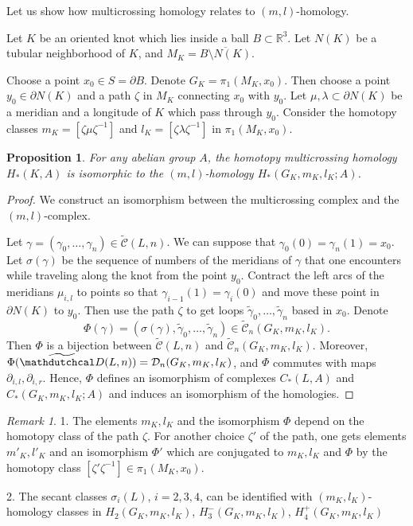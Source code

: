 \documentclass{article}
\newtheorem{proposition}{Proposition}
\theoremstyle{definition}
\theoremstyle{remark}
\newtheorem{remark}{Remark}
\def\R{{\mathbb R}}
\begin{document}
Let us show how multicrossing homology relates to $(m,l)$-homology.

Let $K$ be an oriented knot which lies inside a ball $B\subset\R^3$. Let $N(K)$ be a tubular neighborhood of $K$, and $M_K=\overline{B\setminus N(K)}$.

Choose a point $x_0\in S=\partial B$. Denote $G_K=\pi_1(M_K,x_0)$. Then choose a point $y_0\in\partial N(K)$ and a path $\zeta$ in $M_K$ connecting $x_0$ with $y_0$. Let $\mu,\lambda\subset\partial N(K)$ be a meridian and a longitude of $K$ which pass through $y_0$. Consider the homotopy classes $m_K=[\zeta\mu\zeta^{-1}]$ and $l_K=[\zeta\lambda\zeta^{-1}]$ in $\pi_1(M_K,x_0)$.

\begin{proposition}\label{prop:multicrossing_is_ml_homology}
For any abelian group $A$, the homotopy multicrossing homology $H_*(K,A)$ is isomorphic to the $(m,l)$-homology $H_*(G_K,m_K,l_K;A)$.
\end{proposition}
\begin{proof}
    We construct an isomorphism between the multicrossing complex and the $(m,l)$-complex.

Let $\gamma=(\gamma_0,\dots,\gamma_n)\in\widetilde{\mathcal C}(L,n)$. We can suppose that $\gamma_0(0)=\gamma_n(1)=x_0$. Let $\sigma(\gamma)$ be the sequence of numbers of the meridians of $\gamma$ that one encounters while traveling along the knot from the point $y_0$. Contract the left arcs of the meridians $\mu_{i,l}$ to points so that $\gamma_{i-1}(1)=\gamma_i(0)$ and move these point in $\partial N(K)$ to $y_0$. Then use the path $\zeta$ to get loops $\tilde\gamma_0,\dots,\tilde\gamma_n$ based in $x_0$.
Denote
\[
\Phi(\gamma)=(\sigma(\gamma), \tilde\gamma_0,\dots,\tilde\gamma_n)\in\tilde{\mathcal C}_n(G_K,m_K,l_K).
\]
Then $\Phi$ is a bijection between $\widetilde{\mathcal C}(L,n)$ and $\tilde{\mathcal C}_n(G_K,m_K,l_K)$. Moreover, $\Phi(\widetilde{\mathdutchcal D}(L,n))={\mathcal D}_n(G_K,m_K,l_K)$, and $\Phi$ commutes with maps $\partial_{i,l}, \partial_{i,r}$. Hence, $\Phi$ defines an isomorphism of complexes $C_*(L,A)$ and $C_*(G_K,m_K,l_K;A)$ and induces an isomorphism of the homologies.
\end{proof}



\begin{remark}\label{rem:multicrossing_is_ml_homology}
1. The elements $m_K,l_K$ and the isomorphism $\Phi$ depend on the homotopy class of the path $\zeta$. For another choice $\zeta'$ of the path, one gets elements $m'_K,l'_K$ and an isomorphism $\Phi'$  which are conjugated to  $m_K,l_K$ and $\Phi$ by the homotopy class $[\zeta'\zeta^{-1}]\in\pi_1(M_K,x_0)$.

2. The secant classes $\sigma_i(L)$, $i=2,3,4$, can be identified with $(m_K,l_K)$-homology classes in $H_2(G_K,m_K,l_K)$, $H_3^-(G_K,m_K,l_K)$, $H_4^+(G_K,m_K,l_K)$
\end{remark}
\end{document}
